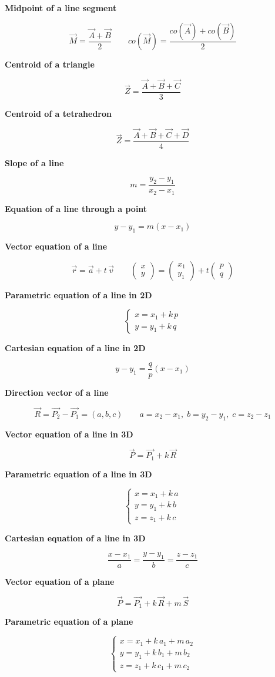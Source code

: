 \documentclass[11pt]{article}
\newcommand{\sub}[1]{\par\medskip\textbf{#1}\par}
\begin{document}
\sub{Midpoint of a line segment}
\[ \vec M = \frac{\vec A + \vec B}{2} \qquad co(\vec M) = \frac{co(\vec A) + co(\vec B)}{2} \]

\sub{Centroid of a triangle}
\[ \vec Z = \frac{\vec A + \vec B + \vec C}{3} \]

\sub{Centroid of a tetrahedron}
\[ \vec Z = \frac{\vec A + \vec B + \vec C + \vec D}{4} \]

\sub{Slope of a line}
\[ m = \frac{y_2 - y_1}{x_2 - x_1} \]

\sub{Equation of a line through a point}
\[ y - y_1 = m(x - x_1) \]

\sub{Vector equation of a line}
\[ \vec r = \vec a + t\,\vec v \qquad \begin{pmatrix}x\\y\end{pmatrix} = \begin{pmatrix}x_1\\y_1\end{pmatrix} + t\begin{pmatrix}p\\q\end{pmatrix} \]

\sub{Parametric equation of a line in 2D}
\[ \begin{cases} x = x_1 + k\,p \\ y = y_1 + k\,q \end{cases} \]

\sub{Cartesian equation of a line in 2D}
\[ y - y_1 = \frac{q}{p}(x - x_1) \]

\sub{Direction vector of a line}
\[ \vec R = \vec{P_2} - \vec{P_1} = (a, b, c) \qquad a = x_2 - x_1,\; b = y_2 - y_1,\; c = z_2 - z_1 \]

\sub{Vector equation of a line in 3D}
\[ \vec P = \vec{P_1} + k\,\vec R \]

\sub{Parametric equation of a line in 3D}
\[ \begin{cases} x = x_1 + k\,a \\ y = y_1 + k\,b \\ z = z_1 + k\,c \end{cases} \]

\sub{Cartesian equation of a line in 3D}
\[ \frac{x - x_1}{a} = \frac{y - y_1}{b} = \frac{z - z_1}{c} \]

\sub{Vector equation of a plane}
\[ \vec P = \vec{P_1} + k\,\vec R + m\,\vec S \]

\sub{Parametric equation of a plane}
\[ \begin{cases} x = x_1 + k\,a_1 + m\,a_2 \\ y = y_1 + k\,b_1 + m\,b_2 \\ z = z_1 + k\,c_1 + m\,c_2 \end{cases} \]
\end{document}
